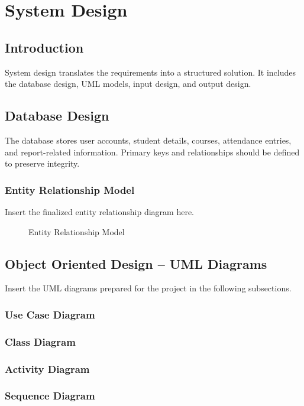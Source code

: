 \documentclass[12pt,a4paper]{report}
\begin{document}
\chapter{System Design}

\section{Introduction}
System design translates the requirements into a structured solution. It includes the database design, UML models, input design, and output design.

\section{Database Design}
The database stores user accounts, student details, courses, attendance entries, and report-related information. Primary keys and relationships should be defined to preserve integrity.

\subsection{Entity Relationship Model}
Insert the finalized entity relationship diagram here.

\begin{figure}[htbp]
  \centering
  \caption{Entity Relationship Model}
\end{figure}

\section{Object Oriented Design -- UML Diagrams}
Insert the UML diagrams prepared for the project in the following subsections.

\subsection{Use Case Diagram}
\subsection{Class Diagram}
\subsection{Activity Diagram}
\subsection{Sequence Diagram}
\end{document}
